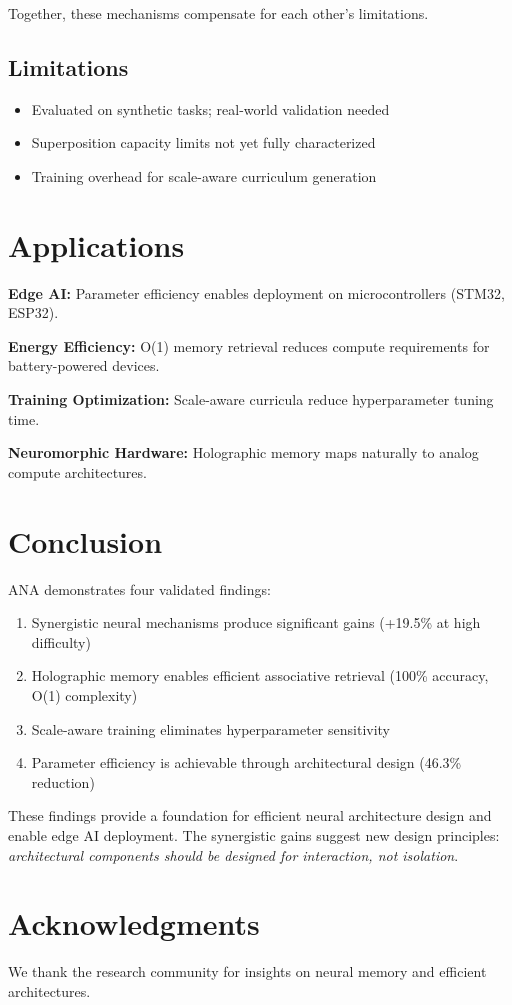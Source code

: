 \documentclass[10pt]{article}
\begin{document}
Together, these mechanisms compensate for each other's limitations.

\subsection{Limitations}

\begin{itemize}
    \item Evaluated on synthetic tasks; real-world validation needed
    \item Superposition capacity limits not yet fully characterized
    \item Training overhead for scale-aware curriculum generation
\end{itemize}

\section{Applications}

\textbf{Edge AI:} Parameter efficiency enables deployment on microcontrollers (STM32, ESP32).

\textbf{Energy Efficiency:} O(1) memory retrieval reduces compute requirements for battery-powered devices.

\textbf{Training Optimization:} Scale-aware curricula reduce hyperparameter tuning time.

\textbf{Neuromorphic Hardware:} Holographic memory maps naturally to analog compute architectures.

\section{Conclusion}

ANA demonstrates four validated findings:
\begin{enumerate}
    \item Synergistic neural mechanisms produce significant gains (+19.5\% at high difficulty)
    \item Holographic memory enables efficient associative retrieval (100\% accuracy, O(1) complexity)
    \item Scale-aware training eliminates hyperparameter sensitivity
    \item Parameter efficiency is achievable through architectural design (46.3\% reduction)
\end{enumerate}

These findings provide a foundation for efficient neural architecture design and enable edge AI deployment. The synergistic gains suggest new design principles: \textit{architectural components should be designed for interaction, not isolation}.

\section*{Acknowledgments}

We thank the research community for insights on neural memory and efficient architectures.
\end{document}
